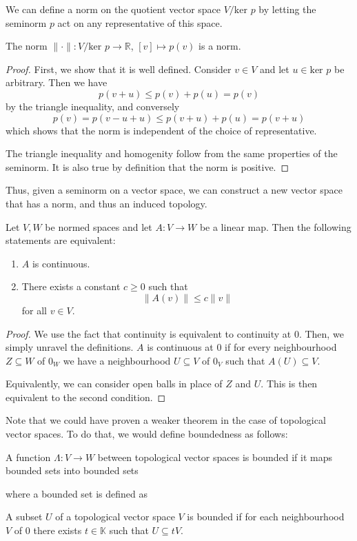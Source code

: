 \documentclass[twoside,symmetric, openany, 12pt]{./tuftebook}
\theoremstyle{definition}
\theoremstyle{definition}
\theoremstyle{definition}
\newenvironment{parts}{\begin{enumerate}[label=(\alph*)]}{\end{enumerate}}
\newcommand{\R}{\mathbb{R}}
\begin{document}
	We can define a norm on the quotient vector space $V / \text{ker } p$ by letting the seminorm $p$ act on any representative of this space. 
	\begin{Theorem}
		The norm $\|\cdot \|: V / \text{ker } p\to \R$,  $[v] \mapsto p(v)$ is a norm.
	\end{Theorem}
\begin{proof}
	First, we show that it is well defined. Consider $v\in V$ and let $u\in \text{ker }p$ be arbitrary. Then we have
	\[p(v+u)\le p(v)+p(u)=p(v)\]
	by the triangle inequality, and conversely
	\[p(v)=p(v-u+u)\le p(v+u)+p(u)=p(v+u)\]
	which shows that the norm is independent of the choice of representative.
	
	The triangle inequality and homogenity follow from the same properties of the seminorm. It is also true by definition that the norm is positive.
\end{proof}
Thus, given a seminorm on a vector space, we can construct a new vector space that has a norm, and thus an induced topology. 
\begin{Theorem}
	Let $V,W$ be normed spaces and let $A:V\to W$ be a linear map. Then the following statements are equivalent:
	\begin{parts}
		\item $A$ is continuous.
		\item There exists a constant $c\ge 0$ such that
		\[\|A(v)\| \le c\|v\|\]
		for all $v\in V$.
	\end{parts}
\end{Theorem}
\begin{proof}
	We use the fact that continuity is equivalent to continuity at 0. Then, we simply unravel the definitions. $A$ is continuous at 0 if for every neighbourhood $Z\subseteq W$ of $0_W$ we have a neighbourhood $U\subseteq V$ of $0_V$ such that $A(U)\subseteq V$.
	
	Equivalently, we can consider open balls in place of $Z$ and $U$. This is then equivalent to the second condition.
\end{proof}
Note that we could have proven a weaker theorem in the case of topological vector spaces. To do that, we would define boundedness as follows:
\begin{Definition}
	A function $\Lambda:V\to W$ between topological vector spaces is bounded if it maps bounded sets into bounded sets
\end{Definition}
where a bounded set is defined as
\begin{Definition}
	A subset $U$ of a topological vector space $V$ is bounded if for each neighbourhood $V$ of $0$ there exists $t\in \mathbb{K}$ such that $U\subseteq tV$. 
\end{Definition}
\end{document}
